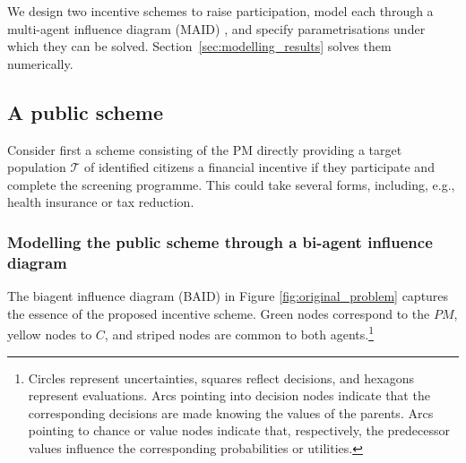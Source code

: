 \documentclass[12pt]{article}
\begin{document}
 We design two incentive schemes to raise participation, model each through a multi-agent influence diagram (MAID) \citep{banks2015adversarial}, and specify parametrisations under which they can be solved. Section~\ref{sec:modelling_results} solves them numerically.

\subsection{A public scheme}\label{sec:public_scheme}
Consider first a scheme consisting of the PM directly providing a target population $\mathcal{T}$ of identified citizens a financial incentive if they participate and complete the screening programme. This could take several forms, including, e.g., health insurance or tax reduction.

\subsubsection{Modelling the public scheme through a bi-agent influence diagram}
The biagent influence diagram (BAID) in Figure \ref{fig:original_problem} captures the essence of the proposed incentive scheme. Green nodes correspond to the  $PM$, yellow nodes to $C$, and striped nodes are common to both agents.\footnote{Circles represent uncertainties, squares reflect decisions, and hexagons represent evaluations. Arcs pointing into decision nodes indicate that the corresponding decisions are made knowing the values of the parents. Arcs pointing to chance or value nodes indicate that, respectively, the predecessor values influence the corresponding probabilities or utilities.}
 
\end{document}
